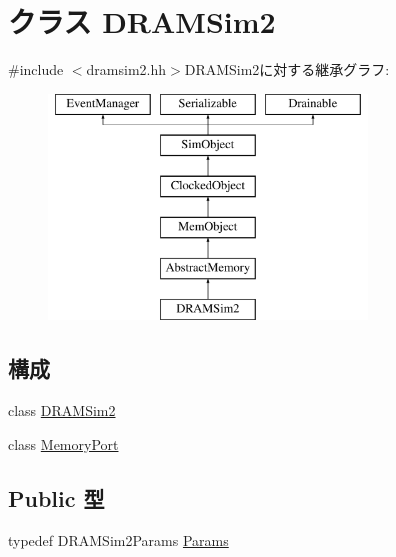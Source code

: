 \hypertarget{classDRAMSim2}{
\section{クラス DRAMSim2}
\label{classDRAMSim2}
}


{\ttfamily \#include $<$dramsim2.hh$>$}DRAMSim2に対する継承グラフ:\begin{figure}[H]
\begin{center}
\leavevmode
\includegraphics[height=6cm]{classDRAMSim2}
\end{center}
\end{figure}
\subsection*{構成}
\begin{DoxyCompactItemize}
\item 
class \hyperlink{classDRAMSim2_1_1DRAMSim2}{DRAMSim2}
\item 
class \hyperlink{classDRAMSim2_1_1MemoryPort}{MemoryPort}
\end{DoxyCompactItemize}
\subsection*{Public 型}
\begin{DoxyCompactItemize}
\item 
typedef DRAMSim2Params \hyperlink{classDRAMSim2_ae66665a06c9d64a6ba0e56d589b74d6c}{Params}
\end{DoxyCompactItemize}
